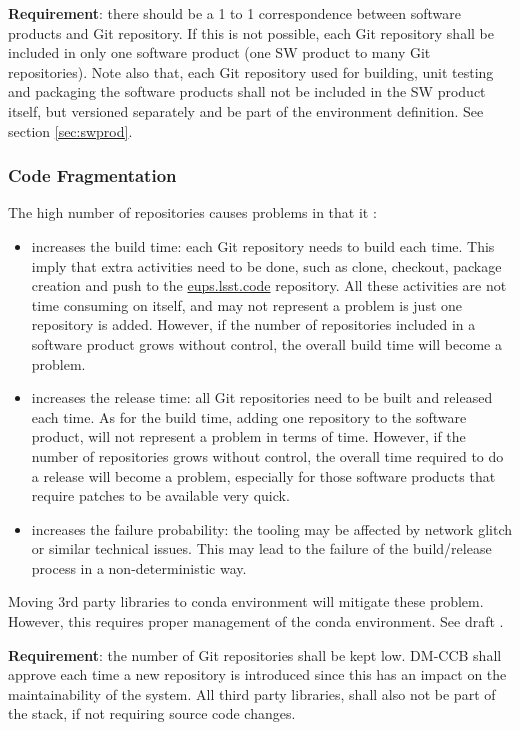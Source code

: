 \textbf{Requirement}: there should be a 1 to 1 correspondence between software products and Git repository. 
If this is not possible, each Git repository shall be included in only one software product (one SW product to many Git repositories).
Note also that, each Git repository used for building, unit testing and packaging the software products shall not be included in the SW product itself, but versioned separately and be part of the environment definition. See section \ref{sec:swprod}.


\subsubsection{Code Fragmentation} \label{sec:problemCode}

The high number of repositories causes problems in that it :

\begin{itemize}
\item increases the build time: each Git repository needs to build each time. 
This imply that extra activities need to be done, such as clone, checkout, package creation and push to the \url{eups.lsst.code} repository.
All these activities are not time consuming on itself, and may not represent a problem is just one repository is added.
However, if the number of repositories included in a software product grows without control, the overall build time will become a problem.
\item increases the release time: all Git repositories need to be built and released each time.
As for the build time, adding one repository to the software product, will not represent a problem in terms of time.
However, if the number of repositories grows without control, the overall time required to do a release will become a problem, especially for those software products that require patches to be available very quick.
\item increases the failure probability: the tooling may be affected by network glitch or similar technical issues. 
This may lead to the failure of the build/release process in a non-deterministic way.
\end{itemize}

Moving 3rd party libraries to conda environment will mitigate these problem. 
However, this requires proper management of the conda environment. See draft .

\textbf{Requirement}: the number of Git repositories shall be kept low. DM-CCB shall approve each time a new repository is introduced since this has an impact on the maintainability of the system. 
All third party libraries, shall also not be part of the stack, if not requiring source code changes.


